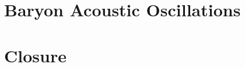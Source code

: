 \documentclass{book}%
\begin{document}
\chapter{Baryon Acoustic Oscillations}
%

\chapter{Closure}
%


\backmatter %

\end{document}
